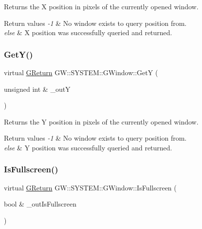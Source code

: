 Returns the X position in pixels of the currently opened window. 


\begin{DoxyRetVals}{Return values}
{\em -\/1} & No window exists to query position from. \\
\hline
{\em else} & X position was successfully queried and returned. \\
\hline
\end{DoxyRetVals}
\mbox{\label{class_g_w_1_1_s_y_s_t_e_m_1_1_g_window_a58d456c963afd1b4d9235a1336d57754}} 
\subsubsection{\texorpdfstring{Get\+Y()}{GetY()}}
{\footnotesize\ttfamily virtual \mbox{\hyperlink{namespace_g_w_a67a839e3df7ea8a5c5686613a7a3de21}{G\+Return}} G\+W\+::\+S\+Y\+S\+T\+E\+M\+::\+G\+Window\+::\+GetY (\begin{DoxyParamCaption}\item[{unsigned int \&}]{\+\_\+outY }\end{DoxyParamCaption})\hspace{0.3cm}{\ttfamily [pure virtual]}}



Returns the Y position in pixels of the currently opened window. 


\begin{DoxyRetVals}{Return values}
{\em -\/1} & No window exists to query position from. \\
\hline
{\em else} & Y position was successfully queried and returned. \\
\hline
\end{DoxyRetVals}
\mbox{\label{class_g_w_1_1_s_y_s_t_e_m_1_1_g_window_a28ae1c50fbd7c1c292ed5aa055cae9a7}} 
\subsubsection{\texorpdfstring{Is\+Fullscreen()}{IsFullscreen()}}
{\footnotesize\ttfamily virtual \mbox{\hyperlink{namespace_g_w_a67a839e3df7ea8a5c5686613a7a3de21}{G\+Return}} G\+W\+::\+S\+Y\+S\+T\+E\+M\+::\+G\+Window\+::\+Is\+Fullscreen (\begin{DoxyParamCaption}\item[{bool \&}]{\+\_\+out\+Is\+Fullscreen }\end{DoxyParamCaption})\hspace{0.3cm}{\ttfamily [pure virtual]}}



